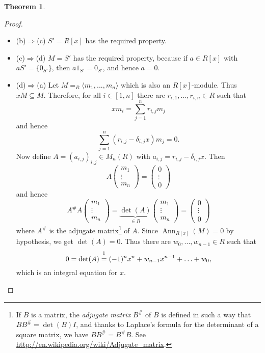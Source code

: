 \documentclass[12pt,a4paper]{report}
\theoremstyle{definition}
\newtheorem{theorem}{Theorem}[chapter] %
\theoremstyle{num.custom-title}
\newenvironment{claim}[1]{\par\noindent\underline{Claim#1:}\space}{} %
\newenvironment{claimproof}[1]{\par\noindent\underline{Proof:}\space#1}{\leavevmode\unskip\penalty9999 \hbox{}\nobreak\hfill\quad\hbox{$\blacksquare$}} %
\DeclareMathOperator{\Ann}{Ann}
\DeclareMathOperator{\imp}{\Rightarrow}
\DeclareMathOperator{\sse}{\subseteq}
\begin{document}
\begin{theorem}
\begin{proof}
\begin{itemize}
\begin{claim}{}
\begin{claimproof}
\begin{multline*}
\end{multline*}
\end{claimproof}
\item[(b)$\imp$(c)] $S'=R[x]$ has the required property.
\item[(c)$\imp$(d)] $M=S'$ has the required property, because if $a \in R[x]$ with $aS'=\{0_{S'}\}$, then $a 1_{S'} = 0_{S'}$, and hence $a=0$.
\item[(d)$\imp$(a)] Let $M= _R \langle m_1,...,m_n \rangle$ which is also an $R[x]$-module. Thus $x M \sse M$. Therefore, for all $i \in [1,n]$ there are $r_{i,1},...,r_{i,n} \in R$ such that
\[
x m_i = \sum_{j=1}^n r_{i,j} m_j
\]
and hence
\[
\sum_{j=1}^n (r_{i,j} - \delta_{i,j} x) m_j = 0.
\]
Now define $A=(a_{i,j})_{i,j} \in M_n(R)$ with $a_{i,j} = r_{i,j} - \delta_{i,j} x$. Then
\[
A
\begin{pmatrix}
m_1 \\ \vdots \\ m_n
\end{pmatrix}
=
\begin{pmatrix}
0 \\ \vdots \\ 0
\end{pmatrix}
\]
and hence
\[
A^\# A
\begin{pmatrix}
m_1 \\ \vdots \\ m_n
\end{pmatrix}
= \underbrace{\det(A)}_{\in R}
\begin{pmatrix}
m_1 \\ \vdots \\ m_n
\end{pmatrix}
=
\begin{pmatrix}
0 \\ \vdots \\ 0
\end{pmatrix}
\]
where $A^\#$ is the adjugate matrix\footnote{If $B$ is a matrix, the \emph{adjugate matrix} $B^\#$ of $B$ is defined in such a way that $B B^\# = \det(B) I$, and thanks to Laplace's formula for the determinant of a square matrix, we have $B B^\# = B^\# B$. See \url{http://en.wikipedia.org/wiki/Adjugate_matrix}.} of $A$. Since $\Ann_{R[x]}(M)=0$ by hypothesis, we get $\det(A)=0$. Thus there are $w_0,...,w_{n-1} \in R$ such that
\[
0 = \det(A) \stackrel{\footnotemark}{=} (-1)^n x^n + w_{n-1} x^{n-1} + \ldots + w_0,
\]
which is an integral equation for $x$.
\end{claim}
\end{itemize}
\end{proof}
\end{theorem}
\end{document}
